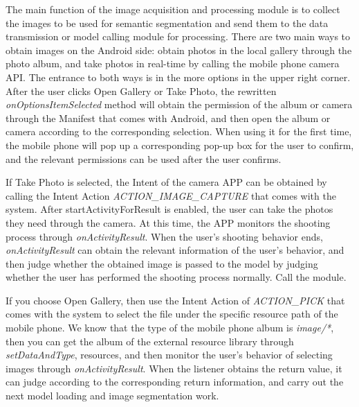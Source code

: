 The main function of the image acquisition and processing module is to collect the images to be used for semantic segmentation and send them to the data transmission or model calling module for processing. There are two main ways to obtain images on the Android side: obtain photos in the local gallery through the photo album, and take photos in real-time by calling the mobile phone camera API. The entrance to both ways is in the more options in the upper right corner. After the user clicks Open Gallery or Take Photo, the rewritten \textit{onOptionsItemSelected} method will obtain the permission of the album or camera through the Manifest that comes with Android, and then open the album or camera according to the corresponding selection. When using it for the first time, the mobile phone will pop up a corresponding pop-up box for the user to confirm, and the relevant permissions can be used after the user confirms.


If Take Photo is selected, the Intent of the camera APP can be obtained by calling the Intent Action \textit{ACTION\_IMAGE\_CAPTURE} that comes with the system. After startActivityForResult is enabled, the user can take the photos they need through the camera. At this time, the APP monitors the shooting process through \textit{onActivityResult}. When the user's shooting behavior ends, \textit{onActivityResult} can obtain the relevant information of the user's behavior, and then judge whether the obtained image is passed to the model by judging whether the user has performed the shooting process normally. Call the module.


If you choose Open Gallery, then use the Intent Action of \textit{ACTION\_PICK} that comes with the system to select the file under the specific resource path of the mobile phone. We know that the type of the mobile phone album is \textit{image/*}, then you can get the album of the external resource library through \textit{setDataAndType}, resources, and then monitor the user's behavior of selecting images through \textit{onActivityResult}. When the listener obtains the return value, it can judge according to the corresponding return information, and carry out the next model loading and image segmentation work.


